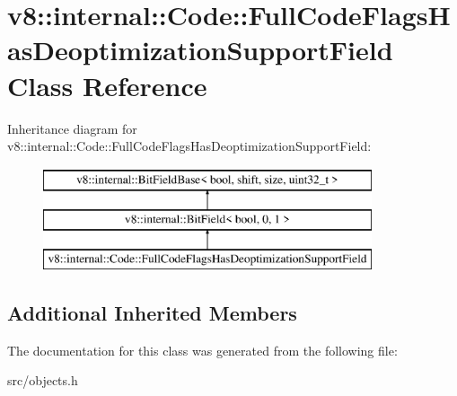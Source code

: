 \hypertarget{classv8_1_1internal_1_1_code_1_1_full_code_flags_has_deoptimization_support_field}{}\section{v8\+:\+:internal\+:\+:Code\+:\+:Full\+Code\+Flags\+Has\+Deoptimization\+Support\+Field Class Reference}
\label{classv8_1_1internal_1_1_code_1_1_full_code_flags_has_deoptimization_support_field}
Inheritance diagram for v8\+:\+:internal\+:\+:Code\+:\+:Full\+Code\+Flags\+Has\+Deoptimization\+Support\+Field\+:\begin{figure}[H]
\begin{center}
\leavevmode
\includegraphics[height=3.000000cm]{classv8_1_1internal_1_1_code_1_1_full_code_flags_has_deoptimization_support_field}
\end{center}
\end{figure}
\subsection*{Additional Inherited Members}


The documentation for this class was generated from the following file\+:\begin{DoxyCompactItemize}
\item 
src/objects.\+h\end{DoxyCompactItemize}
